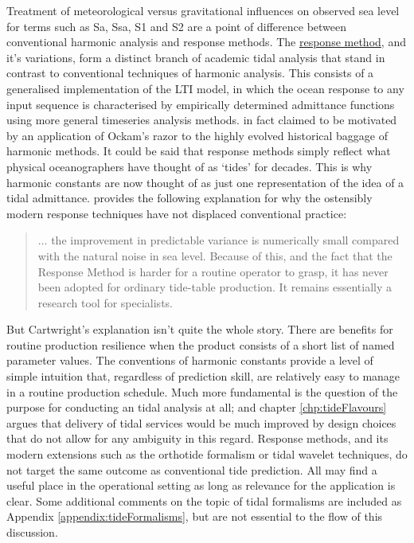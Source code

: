 Treatment of meteorological versus gravitational influences on observed sea level for terms such as Sa, Ssa, S1 and S2 are a point of difference between conventional harmonic analysis and response methods.  
The \underline{response method}, and it's variations, form a distinct branch of academic tidal analysis that stand in contrast to conventional techniques of harmonic analysis.   This consists of a generalised implementation of the LTI model, in which the ocean response to any input sequence is characterised by empirically determined admittance functions using more general timeseries analysis methods.  
\citet{Munk:1966ts} in fact claimed to be motivated by an application of Ockam's razor to the highly evolved historical baggage of harmonic methods.   
It could be said that response methods simply reflect what physical oceanographers have thought of as `tides' for decades.  This is why harmonic constants are now thought of as just one representation of the idea of a tidal admittance. 
\citep[pp 198]{Cartwright:2000tt} provides the following explanation for why the ostensibly modern response techniques have not displaced conventional practice: 
\begin{quotation}
    $\dots$ the improvement in predictable variance is numerically small compared with the natural noise in sea level.   Because of this, and the fact that the Response Method is harder for a routine operator to grasp, it has never been adopted for ordinary tide-table production. It remains essentially a research tool for specialists. 
\end{quotation}
But Cartwright's explanation isn't quite the whole story.   
There are benefits for routine production resilience when the product consists of a short list of named parameter values.   The conventions of harmonic constants provide a level of simple intuition that, regardless of prediction skill, are relatively easy to manage in a routine production schedule.
Much more fundamental is the question of the purpose for conducting an tidal analysis at all; and chapter \ref{chp:tideFlavours} argues that delivery of tidal services would be much improved by design choices that do not allow for any ambiguity in this regard.   
Response methods, and its modern extensions such as the orthotide formalism or tidal wavelet techniques, do not target the same outcome as conventional tide prediction.   All may find a useful place in the operational setting as long as relevance for the application is clear. 
Some additional comments on the topic of tidal formalisms are included as Appendix \ref{appendix:tideFormalisms}, but are not essential to the flow of this discussion.


